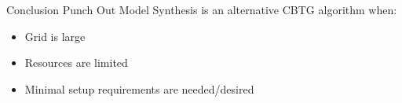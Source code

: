 \documentclass{beamer}
\begin{document}
%







  \begin{frame}[fragile]{Conclusion}
    Punch Out Model Synthesis is an alternative CBTG algorithm when:
    \begin{itemize}
      \item Grid is large
      \item Resources are limited
      \item Minimal setup requirements are needed/desired
    \end{itemize}
  \end{frame}
\end{document}
